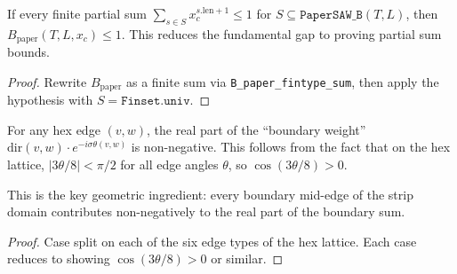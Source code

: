 \begin{theorem}\label{thm:B_paper_from_partial}
\leanok
{}
  If every finite partial sum $\sum_{s \in S} x_c^{s.\text{len}+1} \leq 1$
  for $S \subseteq \texttt{PaperSAW\_B}(T,L)$, then $B_{\text{paper}}(T,L,x_c) \leq 1$.
  This reduces the fundamental gap to proving partial sum bounds.
\end{theorem}
\begin{proof}
\leanok
{}
  Rewrite $B_{\text{paper}}$ as a finite sum via \texttt{B\_paper\_fintype\_sum},
  then apply the hypothesis with $S = \texttt{Finset.univ}$.
\end{proof}

\begin{lemma}\label{lem:boundary_weight_re_nonneg}
\leanok
{}
  For any hex edge $(v, w)$, the real part of the ``boundary weight''
  $\mathrm{dir}(v,w) \cdot e^{-i\sigma\theta(v,w)}$ is non-negative.
  This follows from the fact that on the hex lattice,
  $|3\theta/8| < \pi/2$ for all edge angles $\theta$, so
  $\cos(3\theta/8) > 0$.

  This is the key geometric ingredient: every boundary mid-edge of the
  strip domain contributes non-negatively to the real part of the
  boundary sum.
\end{lemma}
\begin{proof}
\leanok
  Case split on each of the six edge types of the hex lattice.
  Each case reduces to showing $\cos(3\theta/8) > 0$ or similar.
\end{proof}

